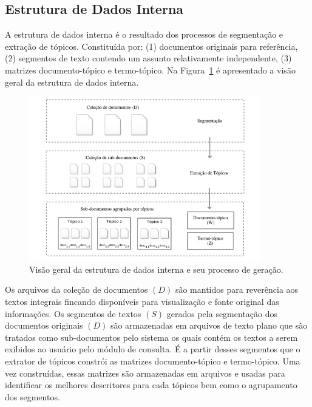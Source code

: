 






\subsection{Estrutura de Dados Interna}

A estrutura de dados interna é o resultado dos processos de segmentação e extração de tópicos. Constituída por: 
(1) documentos originais para referência, 
(2) segmentos de texto contendo um assunto relativamente independente,
(3) matrizes documento-tópico e termo-tópico.
Na Figura~\ref{fig:estrutura-dados-interna} é apresentado a visão geral da estrutura de dados interna. 





	\begin{figure}[h!]
\center
		\includegraphics[trim={ 61 0 61 0 },clip,page=1,width=0.9\textwidth]{conteudo/capitulos/figs/estrutura-de-dados-interna.pdf}

		\caption{Visão geral da estrutura de dados interna e seu processo de geração.}
		\label{fig:estrutura-dados-interna}
	\end{figure}



Os arquivos da coleção de documentos $(D)$ são mantidos para reverência aos textos integrais fincando disponíveis para visualização e fonte original das informações. Os segmentos de textos $(S)$ gerados pela segmentação dos documentos originais $(D)$ são armazenadas em arquivos de texto plano que são tratados como sub-documentos pelo sistema os quais contém os textos a serem exibidos ao usuário pelo módulo de consulta. É a partir desses segmentos que o extrator de tópicos constrói as matrizes documento-tópico e termo-tópico. Uma vez construídas, essas matrizes são armazenadas em arquivos e usadas para identificar os melhores descritores para cada tópicos bem como o agrupamento dos segmentos.





